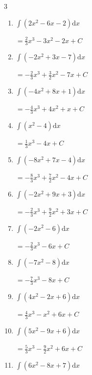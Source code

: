 \begin{multicols}{3}
\begin{enumerate}
  \item $\displaystyle \int \left( 2x^{2}-6x-2 \right) \mathrm{d}x$

        $\displaystyle =\frac{2}{3}x^{3}-3x^{2}-2x+ C$

  \item $\displaystyle \int \left( -2x^{2}+3x-7 \right) \mathrm{d}x$

        $\displaystyle =-\frac{2}{3}x^{3}+\frac{3}{2}x^{2}-7x+ C$

  \item $\displaystyle \int \left( -4x^{2}+8x+1 \right) \mathrm{d}x$

        $\displaystyle =-\frac{4}{3}x^{3}+4x^{2}+x+ C$

  \item $\displaystyle \int \left( x^{2}-4 \right) \mathrm{d}x$

        $\displaystyle =\frac{1}{3}x^{3}-4x+ C$

  \item $\displaystyle \int \left( -8x^{2}+7x-4 \right) \mathrm{d}x$

        $\displaystyle =-\frac{8}{3}x^{3}+\frac{7}{2}x^{2}-4x+ C$

  \item $\displaystyle \int \left( -2x^{2}+9x+3 \right) \mathrm{d}x$

        $\displaystyle =-\frac{2}{3}x^{3}+\frac{9}{2}x^{2}+3x+ C$

  \item $\displaystyle \int \left( -2x^{2}-6 \right) \mathrm{d}x$

        $\displaystyle =-\frac{2}{3}x^{3}-6x+ C$

  \item $\displaystyle \int \left( -7x^{2}-8 \right) \mathrm{d}x$

        $\displaystyle =-\frac{7}{3}x^{3}-8x+ C$

  \item $\displaystyle \int \left( 4x^{2}-2x+6 \right) \mathrm{d}x$

        $\displaystyle =\frac{4}{3}x^{3}-x^{2}+6x+ C$

\columnbreak %

  \item $\displaystyle \int \left( 5x^{2}-9x+6 \right) \mathrm{d}x$

        $\displaystyle =\frac{5}{3}x^{3}-\frac{9}{2}x^{2}+6x+ C$

  \item $\displaystyle \int \left( 6x^{2}-8x+7 \right) \mathrm{d}x$


\end{enumerate}
\end{multicols}
